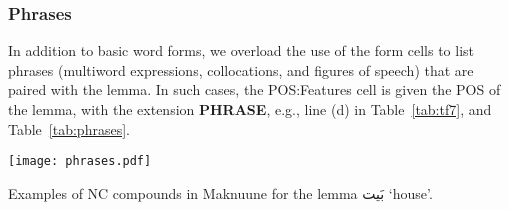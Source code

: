  




\subsubsection*{Phrases} 
In addition to basic word forms, we overload the use of the form cells to list phrases (multiword expressions, collocations, and figures of speech) that are paired with the lemma. In such cases, the POS:Features cell is given the POS of the lemma, with the extension \textbf{PHRASE}, e.g., line (d) in Table~\ref{tab:tf7}, and 
Table~\ref{tab:phrases}.

\begin{table*}[th!]
    \centering
\texttt{[image: phrases.pdf]}
    \caption{Examples of NC compounds in Maknuune for the lemma \foreignlanguage{arabic}{بَيت} `house'.}
    \label{tab:phrases}
\end{table*}
 



